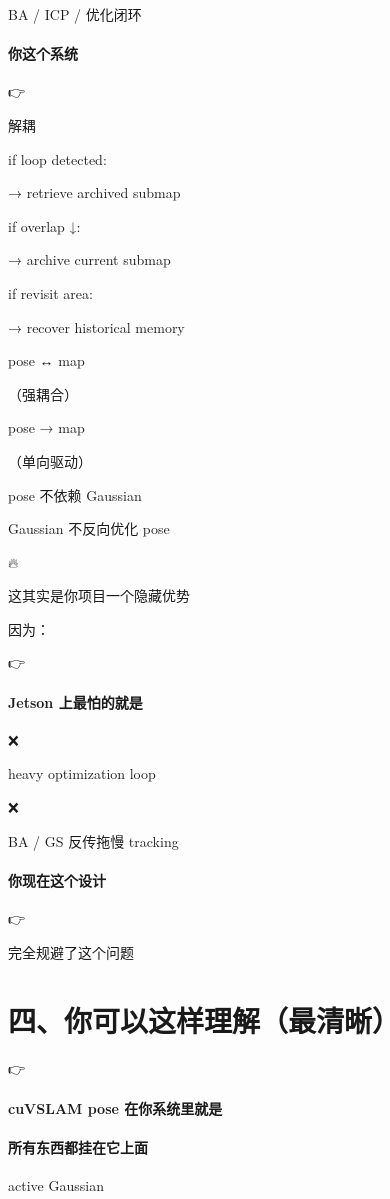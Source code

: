\documentclass[12pt]{article}
\begin{document}
BA / ICP / 优化闭环

\paragraph{你这个系统}
👉

解耦

if loop detected:

→ retrieve archived submap

if overlap ↓:

→ archive current submap

if revisit area:

→ recover historical memory

pose ↔ map

（强耦合）

pose → map

（单向驱动）

pose 不依赖 Gaussian

Gaussian 不反向优化 pose

🔥

这其实是你项目一个隐藏优势

因为：

👉

\paragraph{Jetson 上最怕的就是}
❌

heavy optimization loop

❌

BA / GS 反传拖慢 tracking

\paragraph{你现在这个设计}
👉

完全规避了这个问题

\section{四、你可以这样理解（最清晰）}
👉

\paragraph{cuVSLAM pose 在你系统里就是}
\paragraph{所有东西都挂在它上面}
active Gaussian
\end{document}
